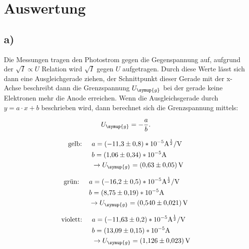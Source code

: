 \newpage
\section{Auswertung}

\subsection{a)}

    \noindent
    Die Messungen tragen den Photostrom gegen die Gegenspannung auf, aufgrund der $\sqrt{I} \propto  U$ Relation wird $\sqrt{I} $ gegen $  U$
    aufgetragen. Durch diese Werte lässt sich dann eine Ausgleichgerade ziehen, der Schnittpunkt dieser Gerade mit der x-Achse beschreibt dann die 
    Grenzspannung $U_{\symup{g}}$ bei der gerade keine Elektronen mehr die Anode erreichen. 
    Wenn die Ausgleichsgerade durch $y = a \cdot x +b$ beschrieben wird, dann berechnet sich die Grenzspannung mittels: 
    \noindent

    \begin{equation}
        U_{\symup{g}} = -  \frac{a}{b}.
    \end{equation}

    \begin{align}
        \text{gelb:  }   \quad     &a = (-\num{11.3}\pm \num{0.8})*10^{-5} \si{\ampere^{\frac{1}{2}}\per\volt}\\
                        &b = (\num{1.06}\pm \num{0.34})*10^{-5} \si{\ampere}\\
                        & \rightarrow U_{\symup{g}} = \SI{0.63 \pm 0.05}{\volt}
    \end{align}         

    \begin{align}
        \text{grün:  }   \quad     &a = (-\num{16.2}\pm \num{0.5})*10^{-5} \si{\ampere^{\frac{1}{2}}\per\volt}\\
                            &b = (\num{8.75}\pm \num{0.19})*10^{-5} \si{\ampere}\\
                            & \rightarrow U_{\symup{g}} = \SI{0.54 \pm 0.021}{\volt}
    \end{align}

    \begin{align}
        \text{violett:  }  \quad      &a = (-\num{11.63}\pm \num{0.2})*10^{-5} \si{\ampere^{\frac{1}{2}}\per\volt}\\
                               &b = (\num{13.09}\pm \num{0.15})*10^{-5} \si{\ampere}\\
                               & \rightarrow U_{\symup{g}} = \SI{1.126 \pm 0.023}{\volt}
    \end{align}

